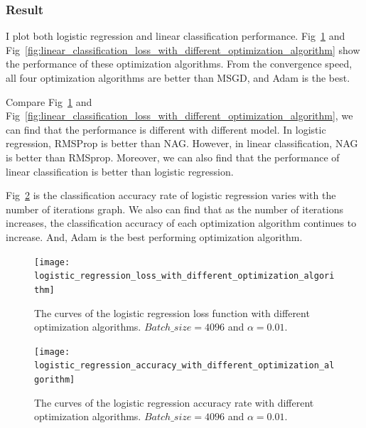 \documentclass[journal, a4paper]{IEEEtran}
\begin{document}
\subsubsection{Result}

I plot both logistic regression and linear classification performance. 
Fig~\ref{fig:logistic_regression_loss_with_different_optimization_algorithm} and Fig~\ref{fig:linear_classification_loss_with_different_optimization_algorithm} show the performance of these optimization algorithms. 
From the convergence speed, all four optimization algorithms are better than MSGD, and Adam is the best. 

Compare Fig~\ref{fig:logistic_regression_loss_with_different_optimization_algorithm} and Fig~\ref{fig:linear_classification_loss_with_different_optimization_algorithm}, we can find that the performance is different with different model. 
In logistic regression, RMSProp is better than NAG. 
However, in linear classification, NAG is better than RMSprop.
Moreover, we can also find that the performance of linear classification is better than logistic regression.

Fig~\ref{fig:logistic_regression_accuracy_with_different_optimization_algorithm} is the classification accuracy rate of logistic regression varies with the number of iterations graph. We also can find that as the number of iterations increases, the classification accuracy of each optimization algorithm continues to increase. And, Adam is the best performing optimization algorithm.


\begin{figure}[!hbt]
    \begin{center}
    \texttt{[image: logistic\_regression\_loss\_with\_different\_optimization\_algorithm]}
    \caption{The curves of the logistic regression loss function with different optimization algorithms. $Batch\_size=4096$ and $\alpha=0.01$.}
    \label{fig:logistic_regression_loss_with_different_optimization_algorithm}
    \end{center}
\end{figure}

\begin{figure}[!hbt]
    \begin{center}
    \texttt{[image: logistic\_regression\_accuracy\_with\_different\_optimization\_algorithm]}
    \caption{The curves of the logistic regression accuracy rate with different optimization algorithms. $Batch\_size=4096$ and $\alpha=0.01$.}
    \label{fig:logistic_regression_accuracy_with_different_optimization_algorithm}
    \end{center}
\end{figure}
\end{document}
